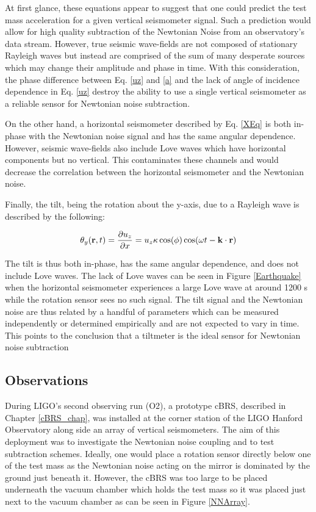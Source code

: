 \documentclass [12pt, proquest]{uwthesis}[2019]
\begin{document}
At first glance, these equations appear to suggest that one could predict the test mass acceleration for a given vertical seismometer signal. Such a prediction would allow for high quality subtraction of the Newtonian Noise from an observatory's data stream. However, true seismic wave-fields are not composed of stationary Rayleigh waves but instead are comprised of the sum of many desperate sources which may change their amplitude and phase in time. With this consideration, the phase difference between Eq. \ref{uz} and \ref{a} and the lack of angle of incidence dependence in Eq. \ref{uz} destroy the ability to use a single vertical seismometer as a reliable sensor for Newtonian noise subtraction.

On the other hand, a horizontal seismometer described by Eq. \ref{XEq} is both in-phase with the Newtonian noise signal and has the same angular dependence. However, seismic wave-fields also include Love waves which have horizontal components but no vertical. This contaminates these channels and would decrease the correlation between the horizontal seismometer and the Newtonian noise. 

Finally, the tilt, being the rotation about the y-axis, due to a Rayleigh wave is described by the following:

\begin{equation}
\theta_y({\bf r} ,t)=\frac{\partial u_z}{\partial x}=u_z \kappa \cos(\phi) \cos(\omega t-{\bf k}\cdot{\bf r})\label{tX}\\
\end{equation}

The tilt is thus both in-phase, has the same angular dependence, and does not include Love waves. The lack of Love waves can be seen in Figure \ref{Earthquake} when the horizontal seismometer experiences a large Love wave at around 1200 s while the rotation sensor sees no such signal. The tilt signal and the Newtonian noise are thus related by a handful of parameters which can be measured independently or determined empirically and are not expected to vary in time. This points to the conclusion that a tiltmeter is the ideal sensor for Newtonian noise subtraction

\subsection{Observations}

During LIGO's second observing run (O2), a prototype cBRS, described in Chapter \ref{cBRS_chap}, was installed at the corner station of the LIGO Hanford Observatory along side an array of vertical seismometers. The aim of this deployment was to investigate the Newtonian noise coupling and to test subtraction schemes. Ideally, one would place a rotation sensor directly below one of the test mass as the Newtonian noise acting on the mirror is dominated by the ground just beneath it. However, the cBRS was too large to be placed underneath the vacuum chamber which holds the test mass so it was placed just next to the vacuum chamber as can be seen in Figure \ref{NNArray}.
\end{document}
